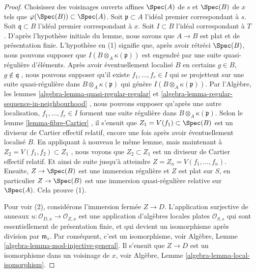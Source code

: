 \begin{proof}
Choisissez des voisinages ouverts affines  $\Spec(A)$  de  $s$  et
 $\Spec(B)$  de  $x$  tels que  $\varphi(\Spec(B)) \subset \Spec(A)$. Soit  $\mathfrak p \subset A$  l'idéal
premier correspondant à  $s$. Soit  $\mathfrak q \subset B$  l'idéal premier
correspondant à  $x$. Soit  $I \subset B$  l'idéal correspondant à
 $T$. D'après l'hypothèse initiale du lemme, nous savons que  $A \to B$ 
est plat et de présentation finie. L'hypothèse en (1) signifie que, après avoir
rétréci  $\Spec(B)$, nous pouvons supposer que  $I(B \otimes_A \kappa(\mathfrak p))$  est engendré par une
suite quasi-régulière d'éléments. Après avoir éventuellement localisé  $B$ 
en certains  $g \in B$,  $g \not \in \mathfrak q$ , nous pouvons supposer qu'il existe
 $f_1, \ldots, f_r \in I$  qui se projettent sur une suite quasi-régulière dans  $B \otimes_A \kappa(\mathfrak p)$  qui
génère  $I(B \otimes_A \kappa(\mathfrak p))$. Par l'Algèbre, les lemmes  \ref{algebra-lemma-quasi-regular-regular}  et  \ref{algebra-lemma-regular-sequence-in-neighbourhood} , nous
pouvons supposer qu'après une autre localisation,  $f_1, \ldots, f_r \in I$  forment une suite
régulière dans  $B \otimes_A \kappa(\mathfrak p)$. Selon le lemme  \ref{lemma-fibre-Cartier} , il s'ensuit que
 $Z_1 = V(f_1) \subset \Spec(B)$  est un diviseur de Cartier effectif relatif, encore une fois après
avoir éventuellement localisé  $B$. En appliquant à nouveau le même lemme,
mais maintenant à  $Z_2 = V(f_1, f_2) \subset Z_1$ , nous voyons que  $Z_2 \subset Z_1$  est un diviseur de
Cartier effectif relatif. Et ainsi de suite jusqu'à atteindre  $Z = Z_n = V(f_1, \ldots, f_n)$.
Ensuite,  $Z \to \Spec(B)$  est une immersion régulière et  $Z$  est plat sur
 $S$, en particulier  $Z \to \Spec(B)$  est une immersion quasi-régulière
relative sur  $\Spec(A)$. Cela prouve (1).

\medskip\noindent
Pour voir (2), considérons l'immersion fermée  $Z \to D$. L'application
surjective de anneaux  $u : \mathcal{O}_{D, x} \to \mathcal{O}_{Z, x}$  est une application d'algèbres locales plates
 $\mathcal{O}_{S, s}$ qui sont essentiellement de présentation finie, et qui devient un
isomorphisme après division par  $\mathfrak m_s$. Par conséquent, c'est un
isomorphisme, voir Algèbre, Lemme  \ref{algebra-lemma-mod-injective-general}. Il s'ensuit que  $Z \to D$  est
un isomorphisme dans un voisinage de  $x$, voir Algèbre, Lemme
 \ref{algebra-lemma-local-isomorphism}.


\end{proof}
